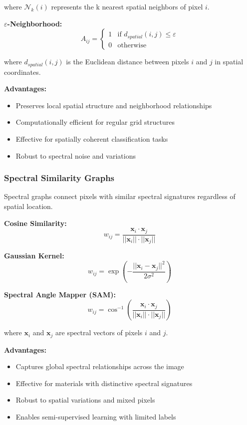 \documentclass[journal]{IEEEtran}
\begin{document}
where $\mathcal{N}_k(i)$ represents the k nearest spatial neighbors of pixel $i$.

\textbf{$\varepsilon$-Neighborhood:}
\begin{equation}
A_{ij} = \begin{cases}
1 & \text{if } d_{spatial}(i,j) \leq \varepsilon \\
0 & \text{otherwise}
\end{cases}
\end{equation}

where $d_{spatial}(i,j)$ is the Euclidean distance between pixels $i$ and $j$ in spatial coordinates.

\textbf{Advantages:}
\begin{itemize}
\item Preserves local spatial structure and neighborhood relationships
\item Computationally efficient for regular grid structures
\item Effective for spatially coherent classification tasks
\item Robust to spectral noise and variations
\end{itemize}

\subsubsection{Spectral Similarity Graphs}

Spectral graphs connect pixels with similar spectral signatures regardless of spatial location.

\textbf{Cosine Similarity:}
\begin{equation}
w_{ij} = \frac{\mathbf{x}_i \cdot \mathbf{x}_j}{||\mathbf{x}_i|| \cdot ||\mathbf{x}_j||}
\end{equation}

\textbf{Gaussian Kernel:}
\begin{equation}
w_{ij} = \exp\left(-\frac{||\mathbf{x}_i - \mathbf{x}_j||^2}{2\sigma^2}\right)
\end{equation}

\textbf{Spectral Angle Mapper (SAM):}
\begin{equation}
w_{ij} = \cos^{-1}\left(\frac{\mathbf{x}_i \cdot \mathbf{x}_j}{||\mathbf{x}_i|| \cdot ||\mathbf{x}_j||}\right)
\end{equation}

where $\mathbf{x}_i$ and $\mathbf{x}_j$ are spectral vectors of pixels $i$ and $j$.

\textbf{Advantages:}
\begin{itemize}
\item Captures global spectral relationships across the image
\item Effective for materials with distinctive spectral signatures
\item Robust to spatial variations and mixed pixels
\item Enables semi-supervised learning with limited labels
\end{itemize}
\end{document}
